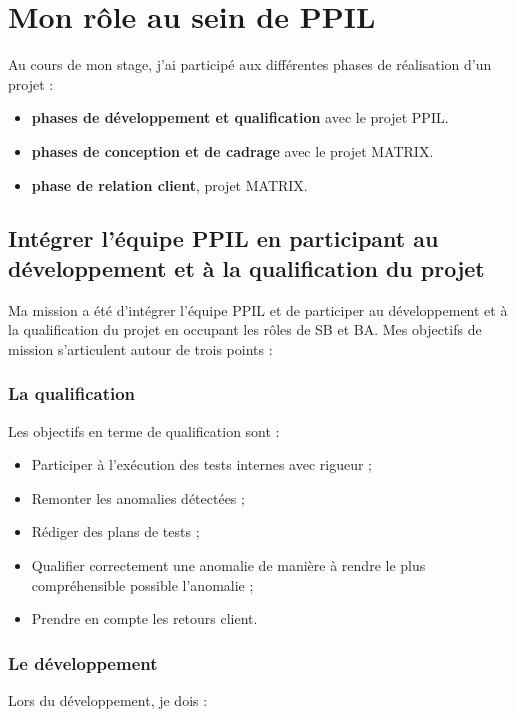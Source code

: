 \chapter{Mon rôle au sein de PPIL}
\label{sec:unchapitre}

Au cours de mon stage, j'ai participé aux différentes phases de réalisation d'un projet : 
\begin{itemize}
    \item \textbf{phases de développement et qualification} avec le projet PPIL.
    \item \textbf{phases de conception et de cadrage} avec le projet MATRIX.
    \item \textbf{phase de relation client}, projet MATRIX.
\end{itemize}

\section{Intégrer l'équipe PPIL en participant au développement et à la qualification du projet}

Ma mission a été d'intégrer l'équipe PPIL et de participer au développement et à la qualification du projet en occupant les rôles de SB et BA. Mes objectifs de mission s'articulent autour de trois points :

\subsection{La qualification} 

Les objectifs en terme de qualification sont :
\begin{itemize}
    \item Participer à l'exécution des tests internes avec rigueur ;
    \item Remonter les anomalies détectées ;
    \item Rédiger des plans de tests ;
    \item Qualifier correctement une anomalie de manière à rendre le plus compréhensible possible l'anomalie ;
    \item Prendre en compte les retours client.
\end{itemize}

\subsection{Le développement} 

Lors du développement, je dois :

